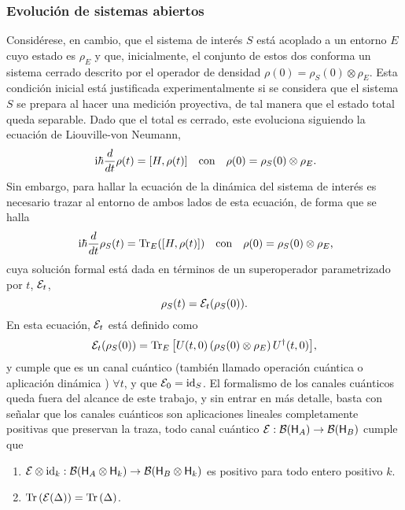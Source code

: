 \subsubsection{Evolución de sistemas abiertos}


Considérese, en cambio, que el sistema de interés $S$ está acoplado a un entorno $E$ cuyo estado es $\rho_{E}$ y que, inicialmente, el conjunto de estos dos conforma un sistema cerrado descrito por el operador de densidad $\rho(0)=\rho_{S}(0)\otimes\rho_{E}$. Esta condición inicial está justificada experimentalmente si se considera que el sistema $S$ se prepara al hacer una medición proyectiva, de tal manera que el estado total queda separable. Dado que el total es cerrado, este evoluciona siguiendo la ecuación de Liouville-von Neumann,
\begin{align}
    \rmi\hbar\frac{d}{d t} \rho(t)=[H,\rho(t)] && \text{con} && \rho(0)=\rho_{S}(0)\otimes\rho_{E}\rlap{.}\nonumber
\end{align}
Sin embargo, para hallar la ecuación de la dinámica del sistema de interés es necesario trazar al entorno de ambos lados de esta ecuación, de forma que se halla
\begin{align}
    \rmi\hbar\frac{d}{d t} \rho_{S}(t)=\Tr_{E}([H,\rho(t)]) && \text{con} && \rho(0)=\rho_{S}(0)\otimes\rho_{E}\rlap{,}\nonumber
\end{align}
cuya solución formal está dada en términos de un superoperador parametrizado por $t$, $\mathcal{E}_{t}$,
\begin{equation}
    \rho_{S}(t)=\mathcal{E}_{t}(\rho_{S}(0)).\nonumber
\end{equation}
En esta ecuación, $\mathcal{E}_{t}$ está definido como
 \begin{equation}
    \mathcal{E}_{t}(\rho_{S}(0))=\Tr_{E}\qty[U(t,0)\left(\rho_{S}(0)\otimes\rho_{E}\right)U^{\dag}(t,0)],\nonumber
 \end{equation}
 y cumple que es un canal cuántico \cite{Ziman} (también llamado operación cuántica \cite{Chuang} o aplicación dinámica \cite{Breuer}) $\forall t$, y que $\mathcal{E}_0=\text{id}_S$. El formalismo de los canales cuánticos queda fuera del alcance de este trabajo, y sin entrar en más detalle, basta con señalar que los canales cuánticos son aplicaciones lineales completamente positivas que preservan la traza, \ie{} todo canal cuántico $\mathcal{E}:\mathcal{B}({\sf H}_{A})\rightarrow \mathcal{B}({\sf H}_{B})$ cumple que \cite{Watrous}
 \begin{enumerate}
    \item $\mathcal{E}\otimes \text{id}_{k}: \mathcal{B}({\sf H}_A \otimes {\sf H}_k)\to \mathcal{B}({\sf H}_B \otimes {\sf H}_k)$ es positivo para todo entero positivo $k$.
    \item $\Tr\qty(\mathcal{E}(\Delta))=\Tr\qty(\Delta)$.
 \end{enumerate}
